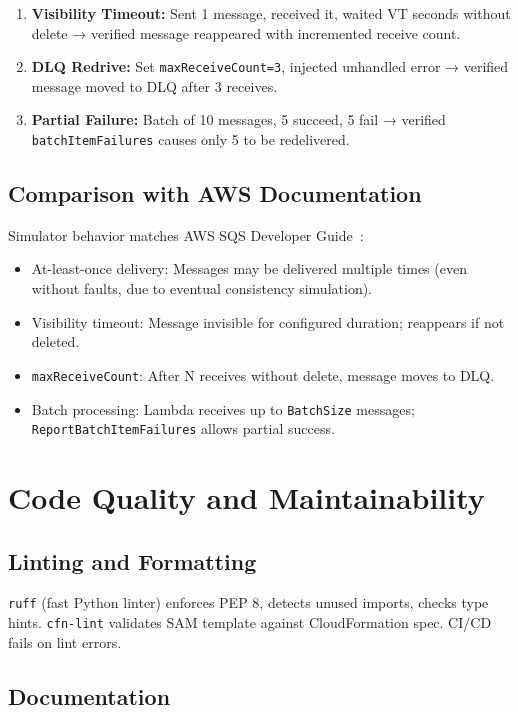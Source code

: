 \begin{enumerate}
    \item \textbf{Visibility Timeout:} Sent 1 message, received it, waited VT seconds without delete → verified message reappeared with incremented receive count.
    \item \textbf{DLQ Redrive:} Set \texttt{maxReceiveCount=3}, injected unhandled error → verified message moved to DLQ after 3 receives.
    \item \textbf{Partial Failure:} Batch of 10 messages, 5 succeed, 5 fail → verified \texttt{batchItemFailures} causes only 5 to be redelivered.
\end{enumerate}

\subsection{Comparison with AWS Documentation}

Simulator behavior matches AWS SQS Developer Guide~\citep{AWSSQSGuide}:
\begin{itemize}
    \item At-least-once delivery: Messages may be delivered multiple times (even without faults, due to eventual consistency simulation).
    \item Visibility timeout: Message invisible for configured duration; reappears if not deleted.
    \item \texttt{maxReceiveCount}: After N receives without delete, message moves to DLQ.
    \item Batch processing: Lambda receives up to \texttt{BatchSize} messages; \texttt{ReportBatchItemFailures} allows partial success.
\end{itemize}

\section{Code Quality and Maintainability}

\subsection{Linting and Formatting}

\texttt{ruff} (fast Python linter) enforces PEP 8, detects unused imports, checks type hints. \texttt{cfn-lint} validates SAM template against CloudFormation spec. CI/CD fails on lint errors.

\subsection{Documentation}

